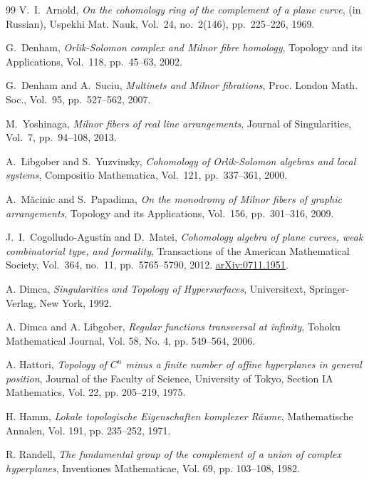 \documentclass[article,11pt]{amsart} \numberwithin{equation}{section}
\numberwithin{equation}{section}
\begin{document}
{\begin{thebibliography}{99}
	V.~I.~Arnold,
	{\it On the cohomology ring of the complement of a plane curve},
	(in Russian), Uspekhi Mat. Nauk, Vol.~24, no.~2(146), pp.~225--226, 1969.
	
	G.~Denham,
	{\it Orlik-Solomon complex and Milnor fibre homology},
	Topology and its Applications,
	Vol.~118, pp.~45--63, 2002.
	
	G.~Denham and A.~Suciu,
	{\it Multinets and Milnor fibrations},
	Proc. London Math. Soc.,
	Vol.~95, pp.~527--562, 2007.
	
	M.~Yoshinaga,
	{\it Milnor fibers of real line arrangements},
	Journal of Singularities,
	Vol.~7, pp.~94--108, 2013.
	
	A.~Libgober and S.~Yuzvinsky,
	{\it Cohomology of Orlik-Solomon algebras and local systems},
	Compositio Mathematica,
	Vol.~121, pp.~337--361, 2000.
	
	A.~Măcinic and S.~Papadima,
	{\it On the monodromy of Milnor fibers of graphic arrangements},
	Topology and its Applications,
	Vol.~156, pp.~301--316, 2009.
	
	J.~I.~Cogolludo-Agust\'in and D.~Matei,
	{\it Cohomology algebra of plane curves, weak combinatorial type, and formality},
	Transactions of the American Mathematical Society,
	Vol.~364, no.~11, pp.~5765--5790, 2012.
	\href{https://arxiv.org/abs/0711.1951}{arXiv:0711.1951}.
	
	A. Dimca,
	{\it Singularities and Topology of Hypersurfaces},
	Universitext,
	Springer-Verlag,
	New York,
	1992.
	
	A. Dimca and A. Libgober,
	{\it Regular functions transversal at infinity},
	Tohoku Mathematical Journal,
	Vol. 58,
	No. 4,
	pp. 549--564,
	2006.
	
	A. Hattori,
	{\it Topology of $C^n$ minus a finite number of affine hyperplanes in general position},
	Journal of the Faculty of Science,
	University of Tokyo,
	Section IA Mathematics,
	Vol. 22,
	pp. 205--219,
	1975.
	
	H. Hamm,
	{\it Lokale topologische Eigenschaften komplexer Räume},
	Mathematische Annalen,
	Vol. 191,
	pp. 235--252,
	1971.
	
	R. Randell,
	{\it The fundamental group of the complement of a union of complex hyperplanes},
	Inventiones Mathematicae,
	Vol. 69,
	pp. 103--108,
	1982.
	

\end{thebibliography}}
\end{document}
